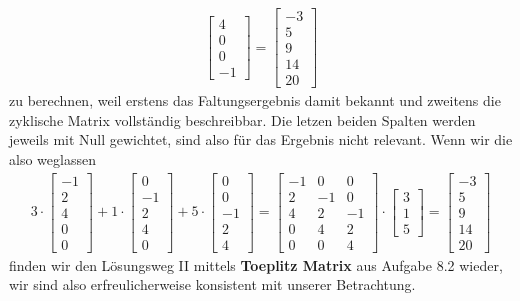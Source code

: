 \begin{ExCalc}
\begin{align}
\begin{bmatrix}
4\\
0\\
0\\
-1
\end{bmatrix}
=
\begin{bmatrix}
-3\\
 5\\
 9\\
14\\
20
\end{bmatrix}
\end{align}
zu berechnen, weil erstens das Faltungsergebnis damit bekannt und zweitens die
zyklische Matrix vollständig beschreibbar.
%
Die letzen beiden Spalten werden jeweils mit Null gewichtet, sind also
für das Ergebnis nicht relevant. Wenn wir die also weglassen
\begin{align}
3 \cdot
\begin{bmatrix}
-1\\
 2\\
 4\\
 0\\
 0
\end{bmatrix}
+ 1 \cdot
\begin{bmatrix}
0\\
-1\\
2\\
4\\
0
\end{bmatrix}
+ 5 \cdot
\begin{bmatrix}
0\\
0\\
-1\\
2\\
4
\end{bmatrix}
=
\begin{bmatrix}
-1  &   0  &   0\\
 2  &  -1  &   0\\
 4  &   2  &  -1\\
 0  &   4  &   2\\
 0  &   0  &   4
\end{bmatrix}
\cdot
\begin{bmatrix}
3\\1\\5
\end{bmatrix}
=
\begin{bmatrix}
-3\\
 5\\
 9\\
14\\
20
\end{bmatrix}
\end{align}
finden wir den Lösungsweg II mittels \textbf{Toeplitz Matrix} aus Aufgabe 8.2 wieder,
wir sind also erfreulicherweise konsistent mit unserer Betrachtung.



\end{ExCalc}
